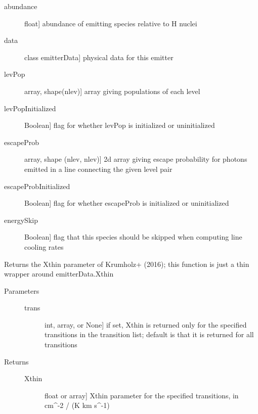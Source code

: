 \documentclass[letterpaper,10pt,english]{sphinxmanual}
\begin{document}
\begin{fulllineitems}
\begin{description}
\begin{description}
\item[{abundance}] \leavevmode{[}float{]}
abundance of emitting species relative to H nuclei

\item[{data}] \leavevmode{[}class emitterData{]}
physical data for this emitter

\item[{levPop}] \leavevmode{[}array, shape(nlev){]}
array giving populations of each level

\item[{levPopInitialized}] \leavevmode{[}Boolean{]}
flag for whether levPop is initialized or uninitialized

\item[{escapeProb}] \leavevmode{[}array, shape (nlev, nlev){]}
2d array giving escape probability for photons emitted in a
line connecting the given level pair

\item[{escapeProbInitialized}] \leavevmode{[}Boolean{]}
flag for whether escapeProb is initialized or uninitialized

\item[{energySkip}] \leavevmode{[}Boolean{]}
flag that this species should be skipped when computing line
cooling rates

\end{description}

\end{description}

\begin{fulllineitems}
\label{fulldoc:despotic.emitter.Xthin}
Returns the Xthin parameter of Krumholz+ (2016); this function
is just a thin wrapper around emitterData.Xthin
\begin{description}
\item[{Parameters}] \leavevmode\begin{description}
\item[{trans}] \leavevmode{[}int, array, or None{]}
if set, Xthin is returned only for the specified
transitions in the transition list; default is that it
is returned for all transitions

\end{description}

\item[{Returns}] \leavevmode\begin{description}
\item[{Xthin}] \leavevmode{[}float or array{]}
Xthin parameter for the specified transitions, in cm\textasciicircum{}-2
/ (K km s\textasciicircum{}-1)


\end{description}
\end{description}
\end{fulllineitems}
\end{fulllineitems}
\end{document}
